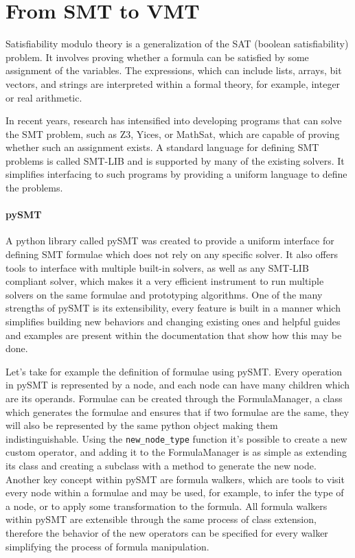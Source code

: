 \section{From SMT to VMT}

Satisfiability modulo theory is a generalization of the SAT (boolean satisfiability) problem.
It involves proving whether a formula can be satisfied by some assignment of the variables.
The expressions, which can include lists, arrays, bit vectors, and strings are interpreted within a formal theory, for example, integer or real arithmetic.

In recent years, research has intensified into developing programs that can solve the SMT problem, such as Z3, Yices, or MathSat, which are capable of proving whether such an assignment exists.
A standard language for defining SMT problems is called SMT-LIB \cite{SMT-LIB} and is supported by many of the existing solvers.
It simplifies interfacing to such programs by providing a uniform language to define the problems.

\paragraph*{pySMT}
A python library called pySMT \cite{pysmt2015} was created to provide a uniform interface for defining SMT formulae which does not rely on any specific solver.
It also offers tools to interface with multiple built-in solvers, as well as any SMT-LIB compliant solver, which makes it a very efficient instrument to run multiple solvers on the same formulae and prototyping algorithms.
One of the many strengths of pySMT is its extensibility, every feature is built in a manner which simplifies building new behaviors and changing existing ones and helpful guides and examples are present within the documentation that show how this may be done.

Let's take for example the definition of formulae using pySMT. Every operation in pySMT is represented by a node, and each node can have many children which are its operands.
Formulae can be created through the FormulaManager, a class which generates the formulae and ensures that if two formulae are the same, they will also be represented by the same python object making them indistinguishable.
Using the \texttt{new_node_type} function it's possible to create a new custom operator, and adding it to the FormulaManager is as simple as extending its class and creating a subclass with a method to generate the new node.
Another key concept within pySMT are formula walkers, which are tools to visit every node within a formulae and may be used, for example, to infer the type of a node, or to apply some transformation to the formula.
All formula walkers within pySMT are extensible through the same process of class extension, therefore the behavior of the new operators can be specified for every walker simplifying the process of formula manipulation.

